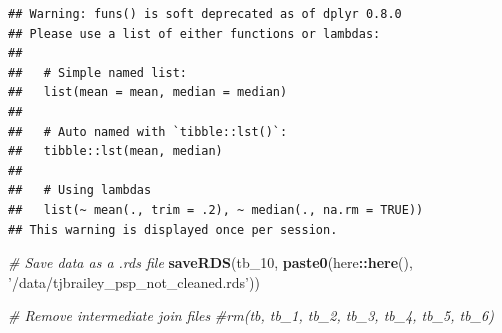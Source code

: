 \documentclass[
]{article}
\newenvironment{Shaded}{\begin{snugshade}}{\end{snugshade}}
\newcommand{\CommentTok}[1]{\textcolor[rgb]{0.56,0.35,0.01}{\textit{#1}}}
\newcommand{\DataTypeTok}[1]{\textcolor[rgb]{0.13,0.29,0.53}{#1}}
\newcommand{\DecValTok}[1]{\textcolor[rgb]{0.00,0.00,0.81}{#1}}
\newcommand{\KeywordTok}[1]{\textcolor[rgb]{0.13,0.29,0.53}{\textbf{#1}}}
\newcommand{\NormalTok}[1]{#1}
\newcommand{\OperatorTok}[1]{\textcolor[rgb]{0.81,0.36,0.00}{\textbf{#1}}}
\newcommand{\StringTok}[1]{\textcolor[rgb]{0.31,0.60,0.02}{#1}}
\begin{document}
\begin{Shaded}
\end{Shaded}

\begin{verbatim}
## Warning: funs() is soft deprecated as of dplyr 0.8.0
## Please use a list of either functions or lambdas: 
## 
##   # Simple named list: 
##   list(mean = mean, median = median)
## 
##   # Auto named with `tibble::lst()`: 
##   tibble::lst(mean, median)
## 
##   # Using lambdas
##   list(~ mean(., trim = .2), ~ median(., na.rm = TRUE))
## This warning is displayed once per session.
\end{verbatim}

\begin{Shaded}
\begin{Highlighting}[]
\CommentTok{# Save data as a .rds file}
\KeywordTok{saveRDS}\NormalTok{(tb_}\DecValTok{10}\NormalTok{, }\KeywordTok{paste0}\NormalTok{(here}\OperatorTok{::}\KeywordTok{here}\NormalTok{(), }\StringTok{'/data/tjbrailey_psp_not_cleaned.rds'}\NormalTok{))}

\CommentTok{# Remove intermediate join files}
\CommentTok{#rm(tb, tb_1, tb_2, tb_3, tb_4, tb_5, tb_6)}
\end{Highlighting}
\end{Shaded}
\end{document}
